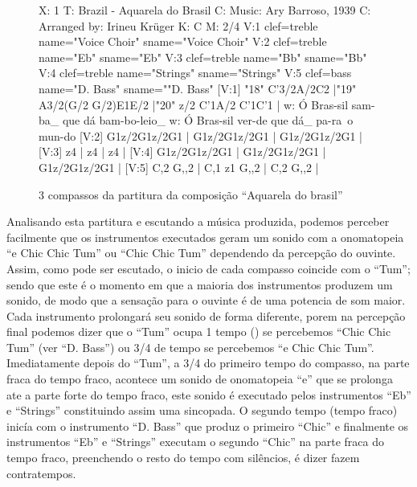 \begin{figure}[H]
\centering
\begin{abc}[name=caquarela]
%
X: 1 %
T: Brazil - Aquarela do Brasil
C: Music: Ary Barroso, 1939
C: Arranged by: Irineu Krüger
K: C %
M: 2/4 %
%
V:1 clef=treble name="Voice Choir" sname="Voice Choir"
V:2 clef=treble name="Eb" sname="Eb"
V:3 clef=treble name="Bb" sname="Bb"
V:4 clef=treble name="Strings" sname="Strings"
V:5 clef=bass   name="D. Bass" sname=""D. Bass"
%
%
[V:1] "18" C'3/2A/2C2  |"19" A3/2(G/2 G/2)E1E/2  |"20" z/2 C'1A/2 C'1C'1  |
w:    Ó Bras-sil        sam-ba_ que dá       bam-bo-leio_ 
w:    Ó Bras-sil        ver-de que dá_       pa-ra~o mun-do 
%
%
[V:2] G1z/2G1z/2G1  | G1z/2G1z/2G1  | G1z/2G1z/2G1  |
%
%
[V:3] z4  | z4  | z4  |
%
%
[V:4] G1z/2G1z/2G1  | G1z/2G1z/2G1  | G1z/2G1z/2G1  |
%
%
[V:5] C,2 G,,2  | C,1 z1 G,,2  | C,2 G,,2  |
\end{abc}
\caption{3 compassos da partitura da composição ``Aquarela do brasil''}
\label{fig:caquarela}
\end{figure}
Analisando esta partitura \cite{Irineu} e escutando a música produzida, podemos perceber facilmente
que os instrumentos executados geram um sonido
com a onomatopeia ``e Chic Chic Tum'' ou ``Chic Chic Tum'' dependendo da percepção do ouvinte. 
Assim, como pode ser escutado, o inicio de cada compasso coincide com o ``Tum''; 
sendo que este é o momento em que a maioria dos instrumentos produzem um sonido, de modo que a sensação para o 
ouvinte é de uma potencia de som maior. Cada instrumento prolongará seu sonido de
forma diferente, porem na percepção final podemos dizer que o ``Tum'' ocupa 1 
tempo (\quarternote) se percebemos ``Chic Chic Tum'' (ver ``D. Bass'') ou 3/4 de tempo se percebemos
``e Chic Chic Tum''. Imediatamente depois do ``Tum'', a 3/4 do primeiro tempo do compasso,
na parte fraca do tempo fraco, 
acontece um sonido de onomatopeia ``e'' que se prolonga ate a parte forte do tempo fraco, 
este sonido é executado pelos instrumentos ``Eb'' e ``Strings'' constituindo assim uma sincopada\cite[pp. 143]{medteoria}.
O segundo tempo (tempo fraco) inicía com o instrumento ``D. Bass'' que produz o primeiro ``Chic''
e finalmente os instrumentos ``Eb'' e ``Strings'' executam o segundo ``Chic''
na parte fraca do tempo fraco, preenchendo o resto do tempo com silêncios, é dizer
fazem contratempos.

